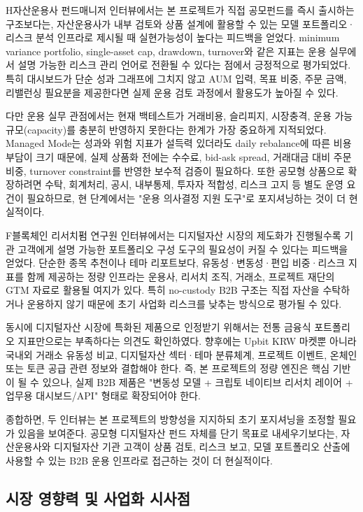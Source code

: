 \documentclass[12pt,a4paper]{article}
\begin{document}
H자산운용사 펀드매니저 인터뷰에서는 본 프로젝트가 직접 공모펀드를 즉시 출시하는 구조보다는, 자산운용사가 내부 검토와 상품 설계에 활용할 수 있는 모델 포트폴리오·리스크 분석 인프라로 제시될 때 실현가능성이 높다는 피드백을 얻었다. minimum variance portfolio, single-asset cap, drawdown, turnover와 같은 지표는 운용 실무에서 설명 가능한 리스크 관리 언어로 전환될 수 있다는 점에서 긍정적으로 평가되었다. 특히 대시보드가 단순 성과 그래프에 그치지 않고 AUM 입력, 목표 비중, 주문 금액, 리밸런싱 필요분을 제공한다면 실제 운용 검토 과정에서 활용도가 높아질 수 있다.

다만 운용 실무 관점에서는 현재 백테스트가 거래비용, 슬리피지, 시장충격, 운용 가능 규모(capacity)를 충분히 반영하지 못한다는 한계가 가장 중요하게 지적되었다. Managed Mode는 성과와 위험 지표가 설득력 있더라도 daily rebalance에 따른 비용 부담이 크기 때문에, 실제 상품화 전에는 수수료, bid-ask spread, 거래대금 대비 주문 비중, turnover constraint를 반영한 보수적 검증이 필요하다. 또한 공모형 상품으로 확장하려면 수탁, 회계처리, 공시, 내부통제, 투자자 적합성, 리스크 고지 등 별도 운영 요건이 필요하므로, 현 단계에서는 "운용 의사결정 지원 도구"로 포지셔닝하는 것이 더 현실적이다.

F블록체인 리서치펌 연구원 인터뷰에서는 디지털자산 시장의 제도화가 진행될수록 기관 고객에게 설명 가능한 포트폴리오 구성 도구의 필요성이 커질 수 있다는 피드백을 얻었다. 단순한 종목 추천이나 테마 리포트보다, 유동성·변동성·편입 비중·리스크 지표를 함께 제공하는 정량 인프라는 운용사, 리서치 조직, 거래소, 프로젝트 재단의 GTM 자료로 활용될 여지가 있다. 특히 no-custody B2B 구조는 직접 자산을 수탁하거나 운용하지 않기 때문에 초기 사업화 리스크를 낮추는 방식으로 평가될 수 있다.

동시에 디지털자산 시장에 특화된 제품으로 인정받기 위해서는 전통 금융식 포트폴리오 지표만으로는 부족하다는 의견도 확인하였다. 향후에는 Upbit KRW 마켓뿐 아니라 국내외 거래소 유동성 비교, 디지털자산 섹터·테마 분류체계, 프로젝트 이벤트, 온체인 또는 토큰 공급 관련 정보와 결합해야 한다. 즉, 본 프로젝트의 정량 엔진은 핵심 기반이 될 수 있으나, 실제 B2B 제품은 "변동성 모델 + 크립토 네이티브 리서치 레이어 + 업무용 대시보드/API" 형태로 확장되어야 한다.

종합하면, 두 인터뷰는 본 프로젝트의 방향성을 지지하되 초기 포지셔닝을 조정할 필요가 있음을 보여준다. 공모형 디지털자산 펀드 자체를 단기 목표로 내세우기보다는, 자산운용사와 디지털자산 기관 고객이 상품 검토, 리스크 보고, 모델 포트폴리오 산출에 사용할 수 있는 B2B 운용 인프라로 접근하는 것이 더 현실적이다.

\subsection{시장 영향력 및 사업화 시사점}
\end{document}
